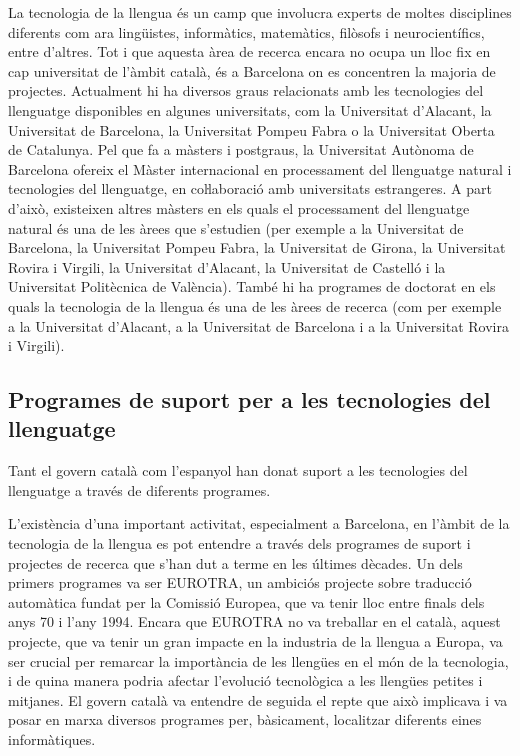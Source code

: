 \begin{multicols}{2}
La tecnologia de la llengua és un camp que involucra experts de moltes disciplines diferents com ara lingüistes, informàtics, matemàtics, filòsofs i neurocientífics, entre d’altres. Tot i que aquesta àrea de recerca encara no ocupa un lloc fix en cap universitat de l’àmbit català, és a Barcelona on es concentren la majoria de projectes. 
Actualment hi ha diversos graus relacionats amb les tecnologies del llenguatge disponibles en algunes universitats, com la Universitat d’Alacant, la Universitat de Barcelona, la Universitat Pompeu Fabra o la Universitat Oberta de Catalunya.
Pel que fa a màsters i postgraus, la Universitat Autònoma de Barcelona ofereix el Màster internacional en processament del llenguatge natural i tecnologies del llenguatge, en coŀlaboració amb universitats estrangeres. A part d’això, existeixen altres màsters en els quals el processament del llenguatge natural és una de les àrees que s’estudien (per exemple a la Universitat de Barcelona, la Universitat Pompeu Fabra, la Universitat de Girona, la Universitat Rovira i Virgili, la Universitat d’Alacant, la Universitat de Castelló i la Universitat Politècnica de València). 
També hi ha programes de doctorat en els quals la tecnologia de la llengua és una de les àrees de recerca (com per exemple a la Universitat d’Alacant, a la Universitat de Barcelona i a la Universitat Rovira i Virgili).

\subsection{Programes de suport per a les tecnologies del llenguatge}

Tant el govern català com l’espanyol han donat suport a les tecnologies del llenguatge a través de diferents programes. 

L’existència d’una important activitat, especialment a Barcelona, en l’àmbit de la tecnologia de la llengua es pot entendre a través dels programes de suport i projectes de recerca que s’han dut a terme en les últimes dècades. Un dels primers programes va ser EUROTRA, un ambiciós projecte sobre traducció automàtica fundat per la Comissió Europea, que va tenir lloc entre finals dels anys 70 i l’any 1994. Encara que EUROTRA no va treballar en el català, aquest projecte, que va tenir un gran impacte en la industria de la llengua a Europa, va ser crucial per remarcar la importància de les llengües en el món de la tecnologia, i de quina manera podria afectar l’evolució tecnològica a les llengües petites i mitjanes. El govern català va entendre de seguida el repte que això implicava i va posar en marxa diversos programes per, bàsicament, localitzar diferents eines informàtiques. 


\end{multicols}
